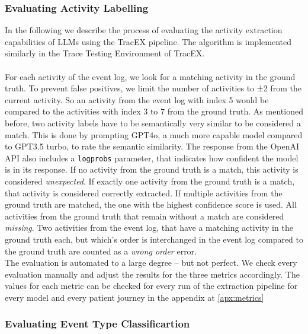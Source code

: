 \subsubsection{Evaluating Activity Labelling}\label{sec:eval_activity}
In the following we describe the process of evaluating the activity extraction capabilities of LLMs using the TracEX pipeline. The algorithm is implemented similarly in the Trace Testing Environment of TracEX.\\\\
For each activity of the event log, we look for a matching activity in the ground truth. To prevent false positives, we limit the number of activities to ±2 from the current activity. So an activity from the event log with index 5 would be compared to the activities with index 3 to 7 from the ground truth. As mentioned before, two activity labels have to be semantically very similar to be considered a match. This is done by prompting GPT4o, a much more capable model compared to GPT3.5 turbo, to rate the semantic similarity. The response from the OpenAI API also includes a \verb|logprobs| parameter, that indicates how confident the model is in its response. If no activity from the ground truth is a match, this activity is considered \emph{unexpected}. If exactly one activity from the ground truth is a match, that activity is considered correctly extracted. If multiple activities from the ground truth are matched, the one with the highest confidence score is used. All activities from the ground truth that remain without a match are considered \emph{missing}. Two activities from the event log, that have a matching activity in the ground truth each, but which's order is interchanged in the event log compared to the ground truth are counted as a \emph{wrong order} error.\\
The evaluation is automated to a large degree – but not perfect. We check every evaluation manually and adjust the results for the three metrics accordingly. The values for each metric can be checked for every run of the extraction pipeline for every model and every patient journey in the appendix at \ref{apx:metrics}

\subsubsection{Evaluating Event Type Classificartion}\label{sec:eval_event_type}
